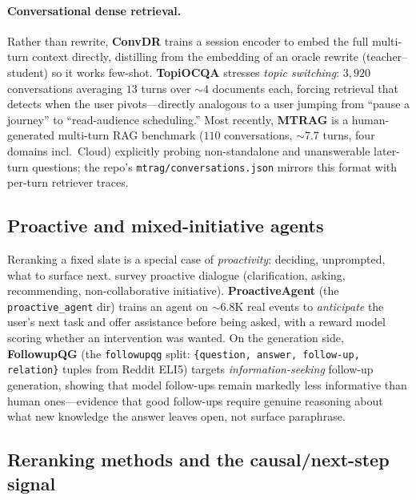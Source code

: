 \paragraph{Conversational dense retrieval.} Rather than rewrite, \textbf{ConvDR}
\citep{fu:yu2021convdr} trains a session encoder to embed the full multi-turn
context directly, distilling from the embedding of an oracle rewrite
(teacher--student) so it works few-shot. \textbf{TopiOCQA}
\citep{fu:adlakha2022topiocqa} stresses \emph{topic switching}: $3{,}920$
conversations averaging $13$ turns over $\sim$4 documents each, forcing
retrieval that detects when the user pivots---directly analogous to a user
jumping from ``pause a journey'' to ``read-audience scheduling.'' Most
recently, \textbf{MTRAG} \citep{fu:katsis2025mtrag} is a human-generated
multi-turn RAG benchmark ($110$ conversations, $\sim$7.7 turns, four domains
incl.\ Cloud) explicitly probing non-standalone and unanswerable later-turn
questions; the repo's \texttt{mtrag/conversations.json} mirrors this format with
per-turn retriever traces.

\subsection{Proactive and mixed-initiative agents}

Reranking a fixed slate is a special case of \emph{proactivity}: deciding,
unprompted, what to surface next. \citet{fu:deng2023mixedinitiative} survey
proactive dialogue (clarification, asking, recommending, non-collaborative
initiative). \textbf{ProactiveAgent} \citep{fu:lu2024proactive} (the
\texttt{proactive\_agent} dir) trains an agent on $\sim$6.8K real events to
\emph{anticipate} the user's next task and offer assistance before being asked,
with a reward model scoring whether an intervention was wanted. On the
generation side, \textbf{FollowupQG} \citep{fu:meng2023followupqg} (the
\texttt{followupqg} split: \texttt{\{question, answer, follow-up, relation\}}
tuples from Reddit ELI5) targets \emph{information-seeking} follow-up
generation, showing that model follow-ups remain markedly less informative than
human ones---evidence that good follow-ups require genuine reasoning about what
new knowledge the answer leaves open, not surface paraphrase.

\subsection{Reranking methods and the causal/next-step signal}

